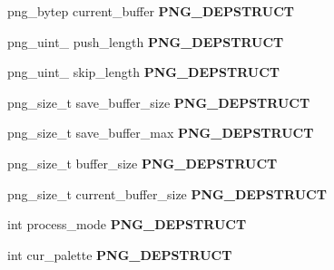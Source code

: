 \begin{DoxyCompactItemize}
\item 
\hypertarget{structpng__struct__def_a9cbd6d18c89d16e3b8f7378aeb590adf}{png\-\_\-bytep current\-\_\-buffer {\bfseries P\-N\-G\-\_\-\-D\-E\-P\-S\-T\-R\-U\-C\-T}}\label{structpng__struct__def_a9cbd6d18c89d16e3b8f7378aeb590adf}

\item 
\hypertarget{structpng__struct__def_aef13adbcbb9798747696c38f91bd4ca6}{png\-\_\-uint\-\_ push\-\_\-length {\bfseries P\-N\-G\-\_\-\-D\-E\-P\-S\-T\-R\-U\-C\-T}}\label{structpng__struct__def_aef13adbcbb9798747696c38f91bd4ca6}

\item 
\hypertarget{structpng__struct__def_a339fada35d707691e37e614886de0dc0}{png\-\_\-uint\-\_ skip\-\_\-length {\bfseries P\-N\-G\-\_\-\-D\-E\-P\-S\-T\-R\-U\-C\-T}}\label{structpng__struct__def_a339fada35d707691e37e614886de0dc0}

\item 
\hypertarget{structpng__struct__def_a823f0a229bc84ae13174a0ffea20c079}{png\-\_\-size\-\_\-t save\-\_\-buffer\-\_\-size {\bfseries P\-N\-G\-\_\-\-D\-E\-P\-S\-T\-R\-U\-C\-T}}\label{structpng__struct__def_a823f0a229bc84ae13174a0ffea20c079}

\item 
\hypertarget{structpng__struct__def_a50e9d4efe6d4d7c7b3fef361d68a1f09}{png\-\_\-size\-\_\-t save\-\_\-buffer\-\_\-max {\bfseries P\-N\-G\-\_\-\-D\-E\-P\-S\-T\-R\-U\-C\-T}}\label{structpng__struct__def_a50e9d4efe6d4d7c7b3fef361d68a1f09}

\item 
\hypertarget{structpng__struct__def_a3722b3e33785918970b62773d5c230d8}{png\-\_\-size\-\_\-t buffer\-\_\-size {\bfseries P\-N\-G\-\_\-\-D\-E\-P\-S\-T\-R\-U\-C\-T}}\label{structpng__struct__def_a3722b3e33785918970b62773d5c230d8}

\item 
\hypertarget{structpng__struct__def_a8f2209911591847ebd29efb04390dfa8}{png\-\_\-size\-\_\-t current\-\_\-buffer\-\_\-size {\bfseries P\-N\-G\-\_\-\-D\-E\-P\-S\-T\-R\-U\-C\-T}}\label{structpng__struct__def_a8f2209911591847ebd29efb04390dfa8}

\item 
\hypertarget{structpng__struct__def_a2c741720283da1f3093506b254844a4e}{int process\-\_\-mode {\bfseries P\-N\-G\-\_\-\-D\-E\-P\-S\-T\-R\-U\-C\-T}}\label{structpng__struct__def_a2c741720283da1f3093506b254844a4e}

\item 
\hypertarget{structpng__struct__def_ac23b6c76ea8a9ac35b11a56053015139}{int cur\-\_\-palette {\bfseries P\-N\-G\-\_\-\-D\-E\-P\-S\-T\-R\-U\-C\-T}}\label{structpng__struct__def_ac23b6c76ea8a9ac35b11a56053015139}


\end{DoxyCompactItemize}
